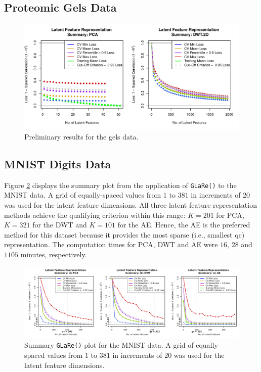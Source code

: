 \subsection{Proteomic Gels Data}\label{sec:gels-reults}

\begin{figure}
    \centering
    \includegraphics[width=1\linewidth]{figures/initial-gels.pdf}
    \caption{Preliminary results for the gels data.}
    \label{fig:enter-label}
\end{figure}


\subsection{MNIST Digits Data}\label{sec:mnist-reults}

Figure \ref{fig:mnist-results} displays the summary plot from the application of \texttt{GLaRe()} to the MNIST data.
A grid of equally-spaced values from $1$ to $381$ in increments of $20$ was used for the latent feature dimensions.
All three latent feature representation methods achieve the qualifying criterion within this range: $K = 201$ for PCA, $K = 321$ for the DWT and $K = 101$ for the AE.
Hence, the AE is the preferred method for this dataset because it provides the most sparse (i.e., smallest qc) representation.
The computation times for PCA, DWT and AE were $16$, $28$ and $1105$ minutes, respectively.

\begin{figure}
    \centering
    \includegraphics[width=1\textwidth]{figures/mnist-results.pdf}
    \caption{Summary \texttt{GLaRe()} plot for the MNIST data. A grid of equally-spaced values from $1$ to $381$ in increments of $20$ was used for the latent feature dimensions.}
    \label{fig:mnist-results}
\end{figure}

